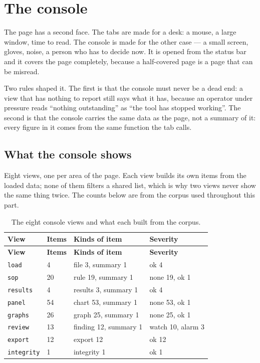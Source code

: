 \chapter{The console}\label{ch:console}

The page has a second face. The tabs are made for a desk: a mouse, a large
window, time to read. The console is made for the other case --- a small screen,
gloves, noise, a person who has to decide now. It is opened from the status bar
and it covers the page completely, because a half-covered page is a page that can
be misread.

Two rules shaped it. The first is that the console must never be a dead end: a
view that has nothing to report still says what it has, because an operator under
pressure reads ``nothing outstanding'' as ``the tool has stopped working''. The
second is that the console carries the same data as the page, not a summary of it:
every figure in it comes from the same function the tab calls.

\section{What the console shows}
Eight views, one per area of the page. Each view builds its own items from the
loaded data; none of them filters a shared list, which is why two views never show
the same thing twice. The counts below are from the corpus used throughout this
part.

{\small
\begin{longtable}{@{}p{3.0cm}p{2.1cm}p{6.8cm}p{3.8cm}@{}}
\caption{The eight console views and what each built from the corpus.}\label{tab:console-views} \\
\toprule \textbf{View} & \textbf{Items} & \textbf{Kinds of item} & \textbf{Severity} \\\midrule\endfirsthead
\toprule \textbf{View} & \textbf{Items} & \textbf{Kinds of item} & \textbf{Severity} \\\midrule\endhead
\texttt{load} & 4 & file 3, summary 1 & ok 4 \\
\texttt{sop} & 20 & rule 19, summary 1 & none 19, ok 1 \\
\texttt{results} & 4 & results 3, summary 1 & ok 4 \\
\texttt{panel} & 54 & chart 53, summary 1 & none 53, ok 1 \\
\texttt{graphs} & 26 & graph 25, summary 1 & none 25, ok 1 \\
\texttt{review} & 13 & finding 12, summary 1 & watch 10, alarm 3 \\
\texttt{export} & 12 & export 12 & ok 12 \\
\texttt{integrity} & 1 & integrity 1 & ok 1 \\
\bottomrule
\end{longtable}}


